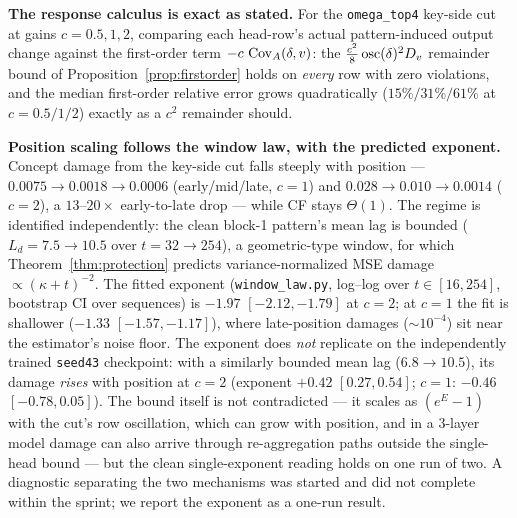 \documentclass{article}
\begin{document}
\textbf{The response calculus is exact as stated.} For the \texttt{omega\_top4} key-side cut at gains $c = 0.5, 1, 2$, comparing each head-row's actual pattern-induced output change against the first-order term $-c\,\operatorname{Cov}_A(\delta, v)$: the $\tfrac{c^2}{8}\operatorname{osc}(\delta)^2 D_v$ remainder bound of Proposition~\ref{prop:firstorder} holds on \emph{every} row with zero violations, and the median first-order relative error grows quadratically ($15\%/31\%/61\%$ at $c = 0.5/1/2$) exactly as a $c^2$ remainder should.

\textbf{Position scaling follows the window law, with the predicted exponent.} Concept damage from the key-side cut falls steeply with position --- $0.0075 \to 0.0018 \to 0.0006$ (early/mid/late, $c = 1$) and $0.028 \to 0.010 \to 0.0014$ ($c = 2$), a $13$--$20\times$ early-to-late drop --- while CF stays $\Theta(1)$. The regime is identified independently: the clean block-1 pattern's mean lag is bounded ($L_d = 7.5 \to 10.5$ over $t = 32 \to 254$), a geometric-type window, for which Theorem~\ref{thm:protection} predicts variance-normalized MSE damage $\propto (\kappa + t)^{-2}$. The fitted exponent (\texttt{window\_law.py}, log--log over $t \in [16, 254]$, bootstrap CI over sequences) is $-1.97$ $[-2.12, -1.79]$ at $c = 2$; at $c = 1$ the fit is shallower ($-1.33$ $[-1.57, -1.17]$), where late-position damages ($\sim 10^{-4}$) sit near the estimator's noise floor. The exponent does \emph{not} replicate on the independently trained \texttt{seed43} checkpoint: with a similarly bounded mean lag ($6.8 \to 10.5$), its damage \emph{rises} with position at $c = 2$ (exponent $+0.42$ $[0.27, 0.54]$; $c = 1$: $-0.46$ $[-0.78, 0.05]$). The bound itself is not contradicted --- it scales as $(e^E - 1)$ with the cut's row oscillation, which can grow with position, and in a 3-layer model damage can also arrive through re-aggregation paths outside the single-head bound --- but the clean single-exponent reading holds on one run of two. A diagnostic separating the two mechanisms was started and did not complete within the sprint; we report the exponent as a one-run result.
\end{document}
